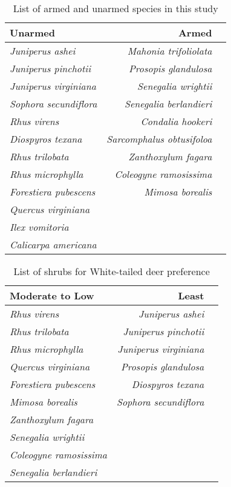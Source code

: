 \documentclass[12pt]{report}
\begin{document}
\begin{table}
    \centering
    \begin{tabular}{lrr}
          Unarmed &  Armed \\
          \hline
          \emph{Juniperus ashei} & \emph{Mahonia trifoliolata}\\
          \emph{Juniperus pinchotii} & \emph{Prosopis glandulosa}\\
          \emph{Juniperus virginiana} & \emph{Senegalia wrightii}\\
          \emph{Sophora secundiflora} & \emph{Senegalia berlandieri}\\
          \emph{Rhus virens} & \emph{Condalia hookeri}\\
          \emph{Diospyros texana} & \emph{Sarcomphalus obtusifoloa}\\
          \emph{Rhus trilobata} & \emph{Zanthoxylum fagara}\\
          \emph{Rhus microphylla} & \emph{Coleogyne ramosissima}\\
          \emph{Forestiera pubescens} & \emph{Mimosa borealis}\\
          \emph{Quercus virginiana} &   \\
          \emph{Ilex vomitoria} &    \\
          \emph{Calicarpa americana} & \\
    \end{tabular}
    \caption{List of armed and unarmed species in this study}
\end{table} 

\begin{table}
    \centering
    \begin{tabular}{lrr}
     Moderate to Low & Least \\
     \hline
    \emph{Rhus virens} & \emph{Juniperus ashei} \\
    \emph{Rhus trilobata} & \emph{Juniperus pinchotii}\\
    \emph{Rhus microphylla} & \emph{Juniperus virginiana}\\
    \emph{Quercus virginiana} & \emph{Prosopis glandulosa}\\
    \emph{Forestiera pubescens} & \emph{Diospyros texana}\\
    \emph{Mimosa borealis} & \emph{Sophora secundiflora}\\
    \emph{Zanthoxylum fagara} &   \\
    \emph{Senegalia wrightii} & \\
    \emph{Coleogyne ramosissima} & \\
    \emph{Senegalia berlandieri} & \\
    \end{tabular}
    \caption{List of shrubs for White-tailed deer preference \citep*{wright2003white}}
\end{table}
\end{document}
